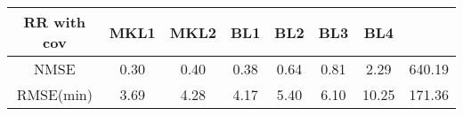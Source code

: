 \begin{tabular}{ccccccc}
	\hline
	RR with cov & MKL1 & MKL2 & BL1 & BL2 & BL3 & BL4\\
	\hline
	NMSE	 & 0.30 & 0.40 & 0.38 & 0.64 & 0.81 & 2.29 & 640.19\\
	RMSE(min)	 & 3.69 & 4.28 & 4.17 & 5.40 & 6.10 & 10.25 & 171.36\\
	\hline
\end{tabular}